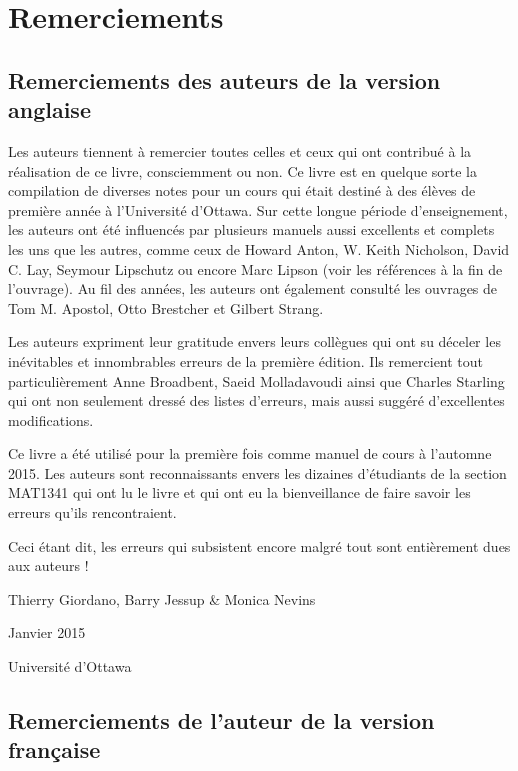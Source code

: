\chapter*{Remerciements}

\section*{Remerciements des auteurs de la version anglaise}
Les auteurs tiennent à remercier toutes celles et ceux qui ont contribué à la réalisation de ce livre, consciemment ou non. Ce livre est en quelque sorte la compilation de diverses notes pour un cours qui était destiné à des élèves de première année à l'Université d'Ottawa. Sur cette longue période d'enseignement, les auteurs ont été influencés par plusieurs manuels aussi excellents et complets les uns que les autres, comme ceux de Howard Anton, W. Keith Nicholson, David C. Lay, Seymour Lipschutz ou encore Marc Lipson (voir les références à la fin de l'ouvrage). Au fil des années, les auteurs ont également consulté les ouvrages de Tom M. Apostol, Otto Brestcher et Gilbert Strang.


Les auteurs expriment leur gratitude envers leurs collègues qui ont su déceler les inévitables et innombrables erreurs de la première édition. Ils remercient tout particulièrement Anne Broadbent, Saeid Molladavoudi ainsi que Charles Starling qui ont non seulement dressé des listes d'erreurs, mais aussi suggéré d'excellentes modifications.

Ce livre a été utilisé pour la première fois comme manuel de cours à l'automne 2015. Les auteurs sont reconnaissants envers les dizaines d'étudiants de la section MAT1341 qui ont lu le livre et qui ont eu la bienveillance de faire savoir les erreurs qu'ils rencontraient.

Ceci étant dit, les erreurs qui subsistent encore malgré tout sont entièrement dues aux auteurs !
{\flushright

Thierry Giordano, Barry Jessup \& Monica Nevins



Janvier 2015



Universit\'e d'Ottawa

}

\section*{Remerciements de l'auteur de la version fran\c{c}aise}

